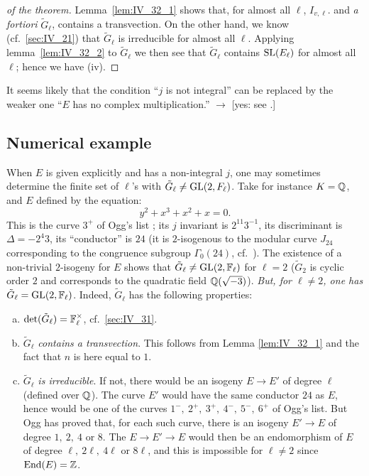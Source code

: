 \begin{proof}[ of the theorem]
	Lemma~\ref{lem:IV_32_1} shows that, for almost all $\ell$, $I_{v,
	\ell}$.  and \emph{a fortiori} $\widetilde{G}_\ell$, contains a
	transvection. On the other hand, we know (cf.\ \ref{sec:IV_21}) that
	$\widetilde{G}_\ell$ is irreducible for almost all $\ell$. Applying
	lemma~\ref{lem:IV_32_2} to $\widetilde{G}_\ell$ we then see that
	$\widetilde{G}_\ell$ contains $\operatorname{SL}({E}_{\ell})$ for almost all
	$\ell$; hence we have (iv).
\end{proof}

\begin{obs}
	It seems likely that the condition ``$j$ is not integral'' can be
	replaced by the weaker one ``$E$ has no complex multiplication.''
	$\to$ [yes: see \cite{76}.]
\end{obs}

\subsection{Numerical example}
\label{sec:IV_33}

When $E$ is given explicitly and has a non-integral $j$, one may sometimes
determine the finite set of $\ell$'s with $\tilde{G}_\ell \neq \operatorname{GL}(2, F_\ell)$.
Take for instance $K = \mathbb{Q}$, and $E$ defined by the equation:
\[
	y^2 + x^3 + x^2 + x = 0.
\]
This is the curve $3^+$ of Ogg's list \cite{20}; its $j$ invariant is $2^11
3^{-1}$, 
\dpage
its discriminant is $ \Delta = -2^4 3$, its ``conductor'' is $24$ (it is
$2$-isogenous to the modular curve $J_{24}$ corresponding to the congruence
subgroup $\Gamma_0(24)$, cf.\ \cite{20}). The existence of a non-trivial
$2$-isogeny for $E$ shows that $\tilde{G}_\ell \neq \operatorname{GL}(2, \mathbb{F}_\ell)$ for $\ell =
2$ ($\tilde{G}_2$ is cyclic order $2$ and corresponds to the quadratic field
$\mathbb{Q}(\sqrt{-3})$). \emph{But, for $\ell \neq 2$, one has $\tilde{G}_\ell =
\operatorname{GL}(2,\mathbb{F}_\ell)$}. Indeed, $\tilde{G}_\ell$ has the following properties:
\begin{enumerate}[(a)]
	\item $\det(\tilde{G}_\ell) = \mathbb{F}^\times_\ell$, cf.\ \ref{sec:IV_31}.
	\item $\tilde{G}_\ell$ \emph{contains a transvection}. This follows from
Lemma \ref{lem:IV_32_1} and the fact that $n$ is here equal to $1$.
	 \item $\tilde{G}_\ell$ \emph{is irreducible}. If not, there would be an
isogeny $E \to E'$ of degree $\ell$ (defined over $\mathbb{Q}$). The curve $E'$ would
have the same conductor $24$ as $E$, hence would be one of the curves
$1^-,~2^+,~3^+,~4^-,~5^-,~6^+$ of Ogg's list. But Ogg has proved that, for each
such curve, there is an isogeny $E' \to E$ of degree $1,~2,~4$ or $8$. The $E
\to E' \to E$ would then be an endomorphism of $E$ of degree
$\ell,~2\ell,~4\ell$ or $8\ell$, and this is impossible for $\ell \neq 2$ since
$\operatorname{End}(E) = \mathbb{Z}$.
\end{enumerate}


